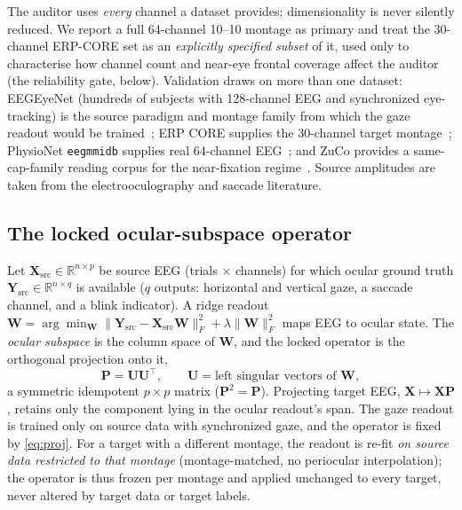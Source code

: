 \documentclass[conference]{IEEEtran}
\begin{document}
The auditor uses \emph{every} channel a dataset provides; dimensionality is never silently
reduced. We report a full 64-channel 10--10 montage as primary and treat the 30-channel
ERP-CORE set as an \emph{explicitly specified subset} of it, used only to characterise how
channel count and near-eye frontal coverage affect the auditor (the reliability gate, below).
Validation draws on more than one dataset: EEGEyeNet (hundreds of subjects with 128-channel
EEG and synchronized eye-tracking) is the source paradigm and montage family from which the
gaze readout would be trained~\cite{kastrati2021eegeyenet}; ERP CORE supplies the 30-channel
target montage~\cite{kappenman2021erpcore}; PhysioNet \texttt{eegmmidb} supplies real
64-channel EEG~\cite{schalk2004bci2000}; and ZuCo provides a same-cap-family reading corpus for
the near-fixation regime~\cite{hollenstein2018zuco}. Source amplitudes are taken from the
electrooculography and saccade literature.

\subsection{The locked ocular-subspace operator}

Let $\mathbf{X}_{\mathrm{src}}\in\mathbb{R}^{n\times p}$ be source EEG (trials $\times$
channels) for which ocular ground truth $\mathbf{Y}_{\mathrm{src}}\in\mathbb{R}^{n\times q}$
is available ($q$ outputs: horizontal and vertical gaze, a saccade channel, and a blink
indicator). A ridge readout
$\mathbf{W}=\arg\min_{\mathbf W}\lVert \mathbf{Y}_{\mathrm{src}}-\mathbf{X}_{\mathrm{src}}\mathbf{W}\rVert_F^2+\lambda\lVert\mathbf{W}\rVert_F^2$
maps EEG to ocular state. The \emph{ocular subspace} is the column space of $\mathbf{W}$, and
the locked operator is the orthogonal projection onto it,
\begin{equation}
\mathbf{P}=\mathbf{U}\mathbf{U}^{\top},\qquad \mathbf{U}=\text{left singular vectors of }\mathbf{W},
\label{eq:proj}
\end{equation}
a symmetric idempotent $p\times p$ matrix ($\mathbf{P}^2=\mathbf{P}$). Projecting target EEG,
$\mathbf{X}\mapsto\mathbf{X}\mathbf{P}$, retains only the component lying in the ocular
readout's span. The gaze readout is trained only on source data with synchronized gaze, and the operator is
fixed by \eqref{eq:proj}. For a target with a different montage, the readout is re-fit \emph{on
source data restricted to that montage} (montage-matched, no periocular interpolation); the
operator is thus frozen per montage and applied unchanged to every target, never altered by
target data or target labels.
\end{document}
